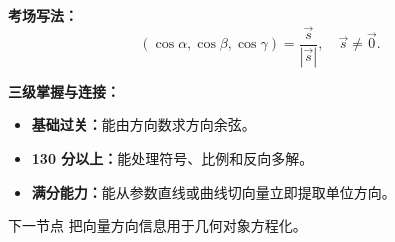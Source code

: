 \begin{knowledgeBox}
\textbf{考场写法：}
\[
\boxed{(\cos\alpha,\cos\beta,\cos\gamma)=\frac{\vec s}{|\vec s|},
\quad \vec s\ne\vec0.}
\]

\textbf{三级掌握与连接：}
\begin{itemize}
  \item \textbf{基础过关：}能由方向数求方向余弦。
  \item \textbf{130 分以上：}能处理符号、比例和反向多解。
  \item \textbf{满分能力：}能从参数直线或曲线切向量立即提取单位方向。
\end{itemize}
下一节点 
把向量方向信息用于几何对象方程化。
\end{knowledgeBox}



